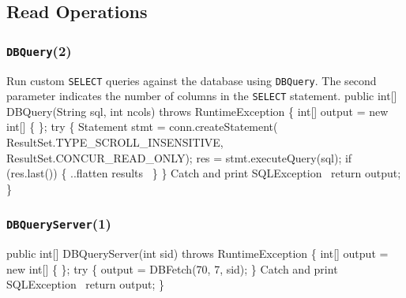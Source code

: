 \documentclass{article}
\def\nwendcode{\endtrivlist \endgroup}
\let\nwdocspar=\par
\theoremstyle{definition}
\begin{document}
\subsection{Read Operations}
\label{sec:read-operations}

\subsubsection{{\tt{}DBQuery}(2)}
Run custom {\tt{}SELECT} queries against the database using
{\tt{}DBQuery}. The second parameter indicates the number of columns in the
{\tt{}SELECT} statement.
\nwenddocs{}\endmoddef{}
public int[] DBQuery(String sql, int ncols) throws RuntimeException \{
  int[] output = new int[] \{ \};
  try \{
    Statement stmt = conn.createStatement(
      ResultSet.TYPE_SCROLL_INSENSITIVE, ResultSet.CONCUR_READ_ONLY);
    res = stmt.executeQuery(sql);
    if (res.last()) \{
      \LA{}..flatten results~{\nwtagstyle{}}\RA{}
    \}
  \}
  \LA{}Catch and print \code{}SQLException\edoc{}~{\nwtagstyle{}}\RA{}
  return output;
\}
\nwendcode{}%

\subsubsection{{\tt{}\protect{}\protect{}DBQueryServer}(1)}
\nwenddocs{}\endmoddef{}
public int[] DBQueryServer(int sid) throws RuntimeException \{
  int[] output = new int[] \{ \};
  try \{
    output = DBFetch(70, 7, sid);
  \}
  \LA{}Catch and print \code{}SQLException\edoc{}~{\nwtagstyle{}}\RA{}
  return output;
\}
\eatline
{}\nwendcode{}\nwdocspar
\end{document}
